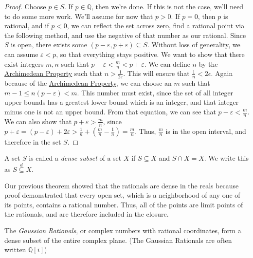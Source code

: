 \begin{proof}
Choose $p \in S$. If $p \in \mathbb{Q}$, then we're done. If this is not the case, we'll need to do some more work. We'll assume for now that $p > 0$. If $p=0$, then $p$ is rational, and if $p < 0$, we can reflect the set across zero, find a rational point via the following method, and use the negative of that number as our rational. Since $S$ is open, there exists some $(p-\varepsilon, p+\varepsilon) \subseteq S$. Without loss of generality, we can assume $\varepsilon < p$, so that everything stays positive. We want to show that there exist integers $m, n$ such that $p-\varepsilon < \frac{m}{n} < p+\varepsilon$. We can define $n$ by the \hyperlink{Archimedean Property}{Archimedean Property} such that $n > \frac{1}{2\varepsilon}$. This will ensure that $\frac{1}{n} < 2\epsilon$. Again because of the \hyperlink{Archimedean Property}{Archimedean Property}, we can choose an $m$ such that $m-1 \leq n(p-\varepsilon) < m$. This number must exist, since the set of all integer upper bounds has a greatest lower bound which is an integer, and that integer minus one is not an upper bound.
From that equation, we can see that $p-\varepsilon < \frac{m}{n}$. We can also show that $p + \varepsilon > \frac{m}{n}$, since $p+\varepsilon = (p-\varepsilon)+ 2\varepsilon > \frac{1}{n}+\left(\frac{m}{n}-\frac{1}{n}\right) = \frac{m}{n}$. Thus, $\frac{m}{n}$ is in the open interval, and therefore in the set $S$.
\end{proof}
\begin{definition}
A set $S$ is called a \emph{dense subset} of a set $X$ if $S \subseteq X$ and $\overline{S} \cap X = X$. We write this as $S \stackrel{d}{\subseteq} X$.
\end{definition}
Our previous theorem showed that the rationals are dense in the reals because proof demonstrated that every open set, which is a neighborhood of any one of its points, contains a rational number. Thus, all of the points are limit points of the rationals, and are therefore included in the closure.
\begin{theorem}
The \emph{Gaussian Rationals}, or complex numbers with rational coordinates, form a dense subset of the entire complex plane. (The Gaussian Rationals are often written $\mathbb{Q} [i]$)
\end{theorem}
